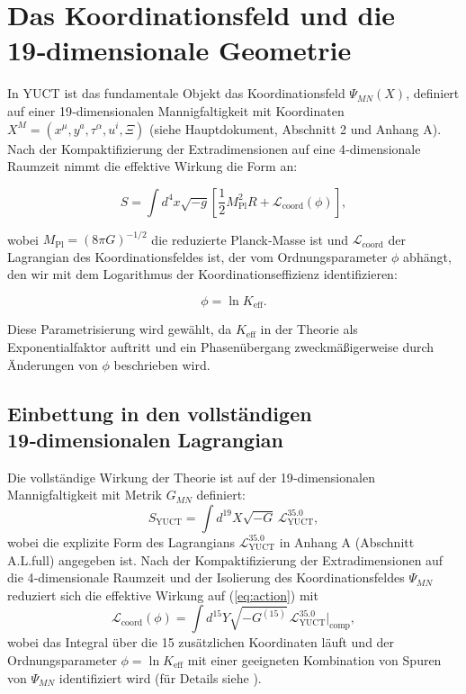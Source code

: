 \documentclass[12pt]{article}
\theoremstyle{remark}
\newcommand{\Keff}{K_{\mathrm{eff}}}
\newcommand{\Mpl}{M_{\mathrm{Pl}}}
\begin{document}
	\section{Das Koordinationsfeld und die 19‑dimensionale Geometrie}
	\label{sec:field}
	
	In YUCT ist das fundamentale Objekt das Koordinationsfeld $\Psi_{MN}(X)$, definiert auf einer 19‑dimensionalen Mannigfaltigkeit mit Koordinaten $X^M = (x^\mu, y^a, \tau^\alpha, u^i, \Xi)$ (siehe Hauptdokument, Abschnitt 2 und Anhang A). Nach der Kompaktifizierung der Extradimensionen auf eine 4‑dimensionale Raumzeit nimmt die effektive Wirkung die Form an:
	
	\begin{equation}
		S = \int d^4x \sqrt{-g} \left[ \frac{1}{2} \Mpl^2 R + \mathcal{L}_{\mathrm{coord}}(\phi) \right],
		\label{eq:action}
	\end{equation}
	
	wobei $\Mpl = (8\pi G)^{-1/2}$ die reduzierte Planck‑Masse ist und $\mathcal{L}_{\mathrm{coord}}$ der Lagrangian des Koordinationsfeldes ist, der vom Ordnungsparameter $\phi$ abhängt, den wir mit dem Logarithmus der Koordinationseffizienz identifizieren:
	
	\begin{equation}
		\phi = \ln \Keff.
		\label{eq:phi-def}
	\end{equation}
	
	Diese Parametrisierung wird gewählt, da $\Keff$ in der Theorie als Exponentialfaktor auftritt und ein Phasenübergang zweckmäßigerweise durch Änderungen von $\phi$ beschrieben wird.
	
	\subsection{Einbettung in den vollständigen 19‑dimensionalen Lagrangian}
	
	Die vollständige Wirkung der Theorie ist auf der 19‑dimensionalen Mannigfaltigkeit mit Metrik $G_{MN}$ definiert:
	\begin{equation}
		S_{\text{YUCT}} = \int d^{19}X \sqrt{-G} \, \mathcal{L}_{\text{YUCT}}^{35.0},
		\label{eq:full-action}
	\end{equation}
	wobei die explizite Form des Lagrangians $\mathcal{L}_{\text{YUCT}}^{35.0}$ in Anhang A (Abschnitt A.L.full) angegeben ist. Nach der Kompaktifizierung der Extradimensionen auf die 4‑dimensionale Raumzeit und der Isolierung des Koordinationsfeldes $\Psi_{MN}$ reduziert sich die effektive Wirkung auf (\ref{eq:action}) mit
	\begin{equation}
		\mathcal{L}_{\mathrm{coord}}(\phi) = \int d^{15}Y \sqrt{-G^{(15)}} \, \mathcal{L}_{\text{YUCT}}^{35.0}\big|_{\text{comp}},
	\end{equation}
	wobei das Integral über die 15 zusätzlichen Koordinaten läuft und der Ordnungsparameter $\phi = \ln\Keff$ mit einer geeigneten Kombination von Spuren von $\Psi_{MN}$ identifiziert wird (für Details siehe \cite{Yakushev2026}).
	
\end{document}

